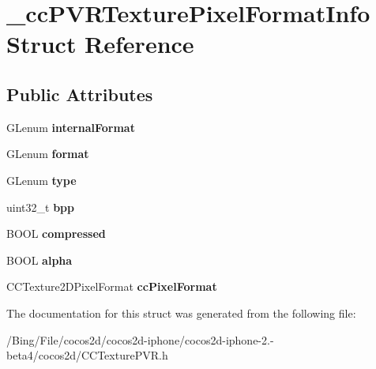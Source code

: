 \hypertarget{struct__cc_p_v_r_texture_pixel_format_info}{\section{\-\_\-cc\-P\-V\-R\-Texture\-Pixel\-Format\-Info Struct Reference}
\label{struct__cc_p_v_r_texture_pixel_format_info}
}
\subsection*{Public Attributes}
\begin{DoxyCompactItemize}
\item 
\hypertarget{struct__cc_p_v_r_texture_pixel_format_info_a2082c32faac0c9f63f095c22744e3830}{G\-Lenum {\bfseries internal\-Format}}\label{struct__cc_p_v_r_texture_pixel_format_info_a2082c32faac0c9f63f095c22744e3830}

\item 
\hypertarget{struct__cc_p_v_r_texture_pixel_format_info_aa79996c969e09f3c817c885b1503c003}{G\-Lenum {\bfseries format}}\label{struct__cc_p_v_r_texture_pixel_format_info_aa79996c969e09f3c817c885b1503c003}

\item 
\hypertarget{struct__cc_p_v_r_texture_pixel_format_info_a1c5ea1116fc2598434805b0710a2450a}{G\-Lenum {\bfseries type}}\label{struct__cc_p_v_r_texture_pixel_format_info_a1c5ea1116fc2598434805b0710a2450a}

\item 
\hypertarget{struct__cc_p_v_r_texture_pixel_format_info_a904cd40163dbd499783d3790fb8972a0}{uint32\-\_\-t {\bfseries bpp}}\label{struct__cc_p_v_r_texture_pixel_format_info_a904cd40163dbd499783d3790fb8972a0}

\item 
\hypertarget{struct__cc_p_v_r_texture_pixel_format_info_ace1c40ea963e288a642ab03af591dbbb}{B\-O\-O\-L {\bfseries compressed}}\label{struct__cc_p_v_r_texture_pixel_format_info_ace1c40ea963e288a642ab03af591dbbb}

\item 
\hypertarget{struct__cc_p_v_r_texture_pixel_format_info_a5afa0634aaeb99f760f43bbad3a295cc}{B\-O\-O\-L {\bfseries alpha}}\label{struct__cc_p_v_r_texture_pixel_format_info_a5afa0634aaeb99f760f43bbad3a295cc}

\item 
\hypertarget{struct__cc_p_v_r_texture_pixel_format_info_aaec6ae5313ea50e1118369c1690ce7ce}{C\-C\-Texture2\-D\-Pixel\-Format {\bfseries cc\-Pixel\-Format}}\label{struct__cc_p_v_r_texture_pixel_format_info_aaec6ae5313ea50e1118369c1690ce7ce}

\end{DoxyCompactItemize}


The documentation for this struct was generated from the following file\-:\begin{DoxyCompactItemize}
\item 
/\-Bing/\-File/cocos2d/cocos2d-\/iphone/cocos2d-\/iphone-\/2.-\/beta4/cocos2d/C\-C\-Texture\-P\-V\-R.\-h\end{DoxyCompactItemize}
